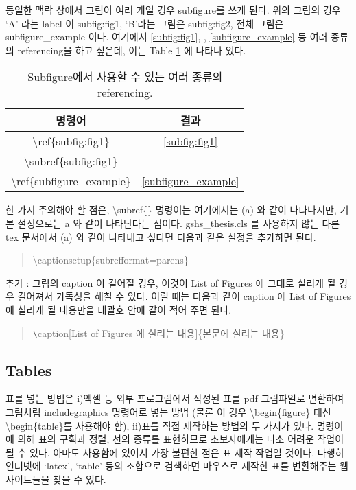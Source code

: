 \documentclass{gshs_thesis}
\begin{document}
동일한 맥락 상에서 그림이 여러 개일 경우 subfigure를 쓰게 된다. 위의 그림의 경우 `A' 라는 label 이 subfig:fig1, `B'라는 그림은 subfig:fig2, 전체 그림은 subfigure\_example 이다. 여기에서 \ref{subfig:fig1}, , \ref{subfigure_example} 등 여러 종류의 referencing을 하고 싶은데, 이는 Table \ref{table_subfigure_ref} 에 나타나 있다. 
\begin{table}[h]
	\caption{Subfigure에서 사용할 수 있는 여러 종류의 referencing.}
	\label{table_subfigure_ref}
	\begin{center}
		\begin{tabular}{|c|c|}
			\hline
			명령어 & 결과 \\
			\hline
			\textbackslash ref\{subfig:fig1\} & \ref{subfig:fig1} \\
			\hline
			\textbackslash subref\{subfig:fig1\} & \subref{subfig:fig1} \\
			\hline
			\textbackslash ref\{subfigure\_example\} & \ref{subfigure_example} \\
			\hline
		\end{tabular}
	\end{center}
\end{table}

한 가지 주의해야 할 점은, \textbackslash subref\{\} 명령어는 여기에서는 (a) 와 같이 나타나지만, 기본 설정으로는 a 와 같이 나타난다는 점이다. gshs\_thesis.cls 를 사용하지 않는 다른 tex 문서에서 (a) 와 같이 나타내고 싶다면 다음과 같은 설정을 추가하면 된다.
\begin{quote}
	\textbackslash captionsetup\{subrefformat=parens\}
\end{quote}

추가 : 그림의 caption 이 길어질 경우, 이것이 List of Figures 에 그대로 실리게 될 경우 길어져서 가독성을 해칠 수 있다. 이럴 때는 다음과 같이 caption 에 List of Figures 에 실리게 될 내용만을 대괄호 안에 같이 적어 주면 된다. 
\begin{quote}
	\verb+\+caption[List of Figures 에 실리는 내용]\{본문에 실리는 내용\}
\end{quote}

\subsection{Tables}

 표를 넣는 방법은 i)엑셀 등 외부 프로그램에서 작성된 표를 pdf 그림파일로 변환하여 그림처럼 includegraphics 명령어로 넣는 방법 (물론 이 경우 {\textbackslash}begin\{figure\} 대신 {\textbackslash}begin\{table\}를 사용해야 함), ii) 표를 직접 제작하는 방법의 두 가지가 있다.  명령어에 의해 표의 구획과 정렬, 선의 종류를 표현하므로 초보자에게는 다소 어려운 작업이 될 수 있다. 아마도  사용함에 있어서 가장 불편한 점은 표 제작 작업일 것이다. 다행히 인터넷에 `latex', `table' 등의 조합으로 검색하면 마우스로 제작한 표를  변환해주는 웹사이트들을 찾을 수 있다.
\end{document}
